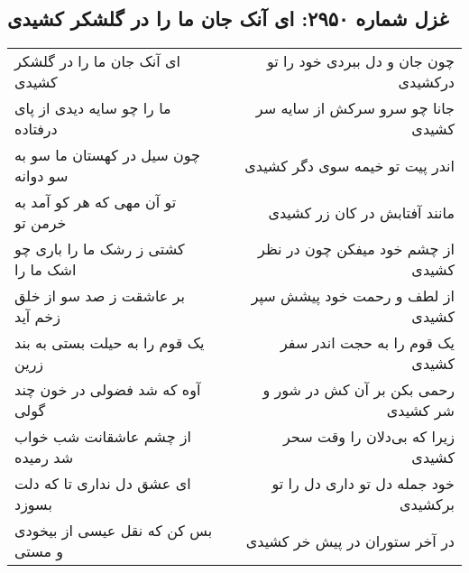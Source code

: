 \begin{center}
\section*{غزل شماره ۲۹۵۰: ای آنک جان ما را در گلشکر کشیدی}
\label{sec:2950}
\begin{longtable}{l p{0.5cm} r}
ای آنک جان ما را در گلشکر کشیدی
&&
چون جان و دل ببردی خود را تو درکشیدی
\\
ما را چو سایه دیدی از پای درفتاده
&&
جانا چو سرو سرکش از سایه سر کشیدی
\\
چون سیل در کهستان ما سو به سو دوانه
&&
اندر پیت تو خیمه سوی دگر کشیدی
\\
تو آن مهی که هر کو آمد به خرمن تو
&&
مانند آفتابش در کان زر کشیدی
\\
کشتی ز رشک ما را باری چو اشک ما را
&&
از چشم خود میفکن چون در نظر کشیدی
\\
بر عاشقت ز صد سو از خلق زخم آید
&&
از لطف و رحمت خود پیشش سپر کشیدی
\\
یک قوم را به حیلت بستی به بند زرین
&&
یک قوم را به حجت اندر سفر کشیدی
\\
آوه که شد فضولی در خون چند گولی
&&
رحمی بکن بر آن کش در شور و شر کشیدی
\\
از چشم عاشقانت شب خواب شد رمیده
&&
زیرا که بی‌دلان را وقت سحر کشیدی
\\
ای عشق دل نداری تا که دلت بسوزد
&&
خود جمله دل تو داری دل را تو برکشیدی
\\
بس کن که نقل عیسی از بیخودی و مستی
&&
در آخر ستوران در پیش خر کشیدی
\\
\end{longtable}
\end{center}
